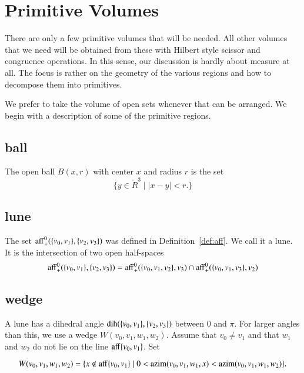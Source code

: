 \section{Primitive Volumes}

There are only a few primitive volumes that will be needed.  All
other volumes that we need will be obtained from these with
Hilbert style scissor and congruence operations.  In this sense,
our discussion is hardly about measure at all.  The focus is rather on
the geometry of the various regions and how to decompose them into
primitives.

We prefer to take the volume of open sets whenever that can be
arranged.  We begin with a description of some of the primitive
regions.






\subsection{ball}

\begin{definition}  The open ball $B(x,r)$ with center $x$ and
radius $r$ is the set
    $$
    \{ y\in\ring{R}^3 \mid |x-y| < r.\}
    $$
\end{definition}


\subsection{lune}

The set ${\operatorname{aff}}^0_+(\{v_0,v_1\},\{v_2,v_3\})$ was defined
in Definition~\ref{def:aff}.  We call it a lune.  It is the intersection
of two open half-spaces
    $$
    {\operatorname{aff}}^0_+(\{v_0,v_1\},\{v_2,v_3\})
    ={\operatorname{aff}}^0_+(\{v_0,v_1,v_2\},v_3)\cap
    {\operatorname{aff}}^0_+(\{v_0,v_1,v_3\},v_2)
    $$

\subsection{wedge}

A lune has a dihedral angle $\operatorname{dih}(\{v_0,v_1\},\{v_2,v_3\})$ between
$0$ and $\pi$.   For larger angles than this, we use a wedge
$W(v_0,v_1,w_1,w_2)$.  Assume that $v_0\ne v_1$ and that
$w_1$ and $w_2$ do not lie on
the line ${\operatorname{aff}}\{v_0,v_1\}$.  Set

$$
W(v_0,v_1,w_1,w_2) = 
\{x\not\in{\operatorname{aff}}\{v_0,v_1\} \mid 0< {\operatorname{azim}}(v_0,v_1,w_1,x) < {\operatorname{azim}}(v_0,v_1,w_1,w_2)\}.
$$


